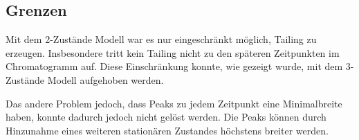 \subsection{Grenzen}

Mit dem 2-Zustände Modell war es nur eingeschränkt möglich, Tailing zu erzeugen. Insbesondere tritt kein Tailing nicht zu den späteren Zeitpunkten im Chromatogramm auf. Diese Einschränkung konnte, wie gezeigt wurde, mit dem 3-Zustände Modell aufgehoben werden. 

Das andere Problem jedoch, dass Peaks zu jedem Zeitpunkt eine Minimalbreite haben, konnte dadurch jedoch nicht gelöst werden. Die Peaks können durch Hinzunahme eines weiteren stationären Zustandes höchstens breiter werden. 

% 

 